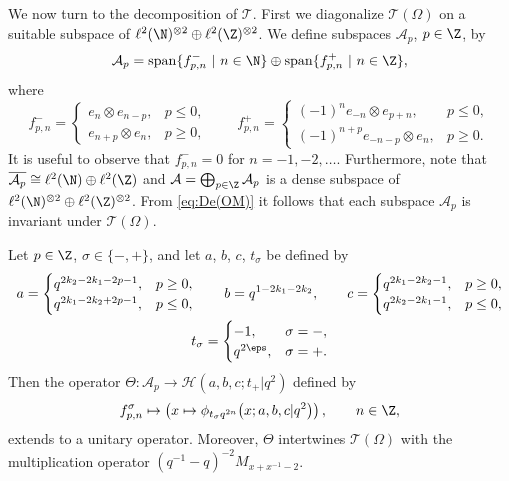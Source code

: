 We now turn to the decomposition of $\mathcal T$. First we diagonalize $\mathcal T(\Omega)$ on a suitable subspace of $\ell^2(\N)^{\otimes 2} \oplus \ell^2(\Z)^{\otimes 2}$. We def\/ine subspaces $\mathcal A_p$, $p\in\Z$, by
\[
\mathcal A_p =  \mathrm{span}\{f_{p,n}^-\ | \ n\in \N\}  \oplus  \mathrm{span} \{f_{p,n}^+\ | \ n \in \Z \},
\]
where
\[
f_{p,n}^- = \begin{cases}
e_n \otimes e_{n-p}, & p \leq 0,\\
e_{n+p} \otimes e_n, & p \geq 0,
\end{cases}
 \qquad
f_{p,n}^+=
\begin{cases}
(-1)^n e_{-n} \otimes e_{p+n}, & p \leq 0,\\
(-1)^{n+p} e_{-n-p} \otimes e_n, & p \geq 0.
\end{cases}
\]
It is useful to observe that $f_{p,n}^-=0$ for $n=-1,-2,\ldots$. Furthermore, note that $\overline{\mathcal A_p} \cong \ell^2(\N) \oplus \ell^2(\Z)$ and $\mathcal A = \bigoplus_{p \in \Z} \mathcal A_p$ is a dense subspace of $\ell^2(\N)^{\otimes 2} \oplus \ell^2(\Z)^{\otimes 2}$. From \eqref{eq:De(OM)} it follows that each subspace $\mathcal A_p$ is invariant under $\mathcal T(\Omega)$.

\begin{proposition} \label{prop:Te}
Let $p \in \Z$, $\sigma \in \{-,+\}$, and let $a$, $b$, $c$, $t_\sigma$ be defined by
\begin{gather}
a= \begin{cases}
q^{2k_2-2k_1-2p-1}, & p \geq 0,\\
q^{2k_1-2k_2+2p-1}, & p \leq 0,
\end{cases}
 \qquad b = q^{1-2k_1-2k_2}, \qquad
c=\begin{cases}
q^{2k_1-2k_2-1}, & p \geq 0,\\
q^{2k_2-2k_1-1}, & p \leq 0,
\end{cases}
\nonumber\\  t_\sigma =
\begin{cases}
-1, & \sigma=-,\\
q^{2\eps}, & \sigma=+.
\end{cases}\label{eq:abct}
\end{gather}
Then the operator $\Theta:\mathcal A_p \rightarrow \mathcal H(a,b,c;t_+|q^2)$ defined by
\[
f_{p,n}^\sigma \mapsto \left(x\mapsto \phi_{t_\sigma q^{2n}}\big(x;a,b,c|q^2\big) \right), \qquad n \in \Z,
\]
extends to a unitary operator. Moreover, $\Theta$ intertwines $\mathcal T(\Omega)$ with the multiplication operator $(q^{-1}-q)^{-2}M_{x+x^{-1}-2}$.
\end{proposition}


